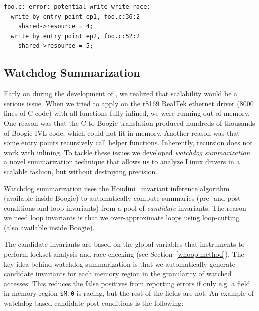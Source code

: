 \begin{lstlisting}
foo.c: error: potential write-write race:
  write by entry point ep1, foo.c:36:2
    shared->resource = 4;
  write by entry point ep2, foo.c:52:2
    shared->resource = 5;
\end{lstlisting}

\subsection{Watchdog Summarization}
\label{whoop:summarization}

Early on during the development of \whoop, we realized that scalability would be a serious issue. When we tried to apply \whoop on the r8169 RealTek ethernet driver (8000 lines of C code) with all functions fully inlined, we were running out of memory. One reason was that the C to Boogie translation produced hundreds of thousands of Boogie IVL code, which could not fit in memory. Another reason was that some entry points recursively call helper functions. Inherently, recursion does not work with inlining. To tackle these issues we developed \emph{watchdog summarization}, a novel summarization technique that allows us to analyze Linux drivers in a scalable fashion, but without destroying precision.

Watchdog summarization uses the Houdini~\cite{flanagan2001houdini} invariant inference algorithm (available inside Boogie) to automatically compute summaries (pre- and post-conditions and loop invariants) from a pool of \emph{candidate} invariants. The reason we need loop invariants is that we over-approximate loops using loop-cutting (also available inside Boogie).

The candidate invariants are based on the global variables that \whoop instruments to perform lockset analysis and race-checking (see Section~\ref{whoop:method}). The key idea behind watchdog summarization is that we automatically generate candidate invariants for each memory region in the granularity of watched accesses. This reduces the false positives from reporting errors if only e.g. a field in memory region \texttt{\$M.0} is racing, but the rest of the fields are not. An example of watchdog-based candidate post-conditions is the following:


